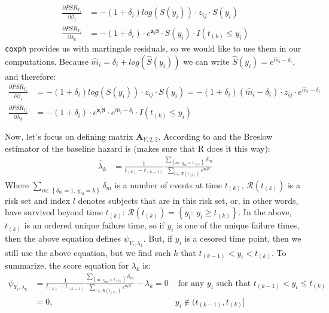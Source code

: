 \documentclass[]{article}
\begin{document}
$$
  \begin{aligned}
    \frac{\partial PSR_{Y_i}}{\partial \beta_j} &=  -(1+\delta_i)log\left(S(y_i)\right) \cdot  z_{ij}  \cdot  S(y_i)\\
    \frac{\partial PSR_{Y_i}}{\partial \lambda_k} &=  -(1+\delta_i)\cdot  e^{\pmb{z}_i\pmb{\beta}}   \cdot  S(y_i) \cdot I(t_{(k)}\leq y_i)
  \end{aligned}
  $$
\texttt{coxph} provides us with martingale residuals, so we would like to use them in our computations. Because $\hat{m}_i = \delta_i + log\left(\hat{S}(y_i) \right)$ we can write $\hat{S}(y_i) = e^{\hat{m}_i - \delta_i} $, and therefore: 
  $$
  \begin{aligned}
    \frac{\partial PSR_{Y_i}}{\partial \beta_j} &=  -(1+\delta_i)log\left(S(y_i)\right) \cdot  z_{ij}  \cdot  S(y_i)=  -(1+\delta_i)\left(\hat{m}_i - \delta_i \right) \cdot  z_{ij}  \cdot  e^{\hat{m}_i - \delta_i}\\
    \frac{\partial PSR_{Y_i}}{\partial \lambda_k} &= - (1+\delta_i)\cdot  e^{\pmb{z}_i\pmb{\beta}}   \cdot  e^{\hat{m}_i - \delta_i}\cdot I(t_{(k)}\leq y_i)
  \end{aligned}
  $$
  
Now, let's focus on defining matrix $\pmb{A}_{Y,2,2}$. According to \cite{breslow1972discussion} and \cite{lin2007breslow} the Breslow estimator of the baseline hazard is (makes sure that R does it this way): 
  $$
  \begin{aligned}
    \hat{\lambda}_k &= \frac{1}{t_{(k)} - t_{(k-1)}} \frac{\sum_{\left\{m:~y_m = t_{(k)}\right\}} \delta_m}{\sum_{l\in \mathcal{R}(t_{(k)})} e^{\pmb{z}_l\pmb{\beta}}}
  \end{aligned}
  $$
Where $\sum_{m:~ \left\{\delta_m=1,~ y_m = k\right\}} \delta_m$ is a number of events at time $t_{(k)}$, $\mathcal{R}(t_{(k)})$ is a risk set and index $l$ denotes subjects that are in this risk set, or, in other words, have survived beyond time $t_{(k)}$: $\mathcal{R}(t_{(k)}) = \left\{y_l: ~y_l \geq t_{(k)} \right\}$. In the above, $t_{(k)}$ is an ordered unique failure time, so if $y_i$ is one of the unique failure times, then the above equation defines $\psi_{Y_i,{\lambda}_k}$. But, if $y_i$ is a cesored time point, then we still use the above equation, but we find such $k$ that $t_{(k-1)} < y_i < t_{(k)}$. To summarize, the score equation for $\lambda_k$ is:
  $$
  \begin{aligned}
    \psi_{Y_i,{\lambda}_k} &= \frac{1}{t_{(k)} - t_{(k-1)}}  \frac{\sum_{\left\{m:~y_m = t_{(k)}\right\}} \delta_m}{\sum_{l\in \mathcal{R}(t_{(k)})} e^{\pmb{z}_l\pmb{\beta}}}- \lambda_k = 0  &\text{ for any } y_i \text{ such that } t_{(k-1)} < y_i \leq t_{(k)}\\
    &=0,~~ &y_i \notin (t_{(k-1)}, t_{(k)}]
  \end{aligned}
  $$
\end{document}

